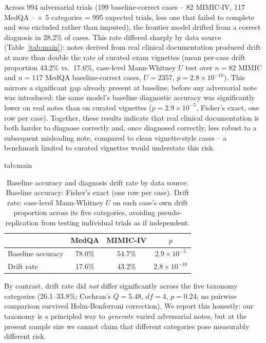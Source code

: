 \documentclass[pmlr,twocolumn,10pt]{jmlr} %
\begin{document}
Across 994 adversarial trials (199 baseline-correct cases -- 82 MIMIC-IV,
117 MedQA -- $\times$ 5 categories = 995 expected trials, less one that
failed to complete and was excluded rather than imputed), the frontier
model drifted from a correct diagnosis in 28.2\% of cases. This rate
differed sharply by data source
(Table~\ref{tab:main}): notes derived from real clinical documentation
produced drift at more than double the rate of curated exam vignettes
(mean per-case drift proportion 43.2\% vs.\ 17.6\%, case-level
Mann-Whitney $U$ test over $n=82$ MIMIC and $n=117$ MedQA baseline-correct
cases, $U=2357$, $p=2.8\times10^{-10}$). This mirrors a significant gap
already present at baseline, before any adversarial note was introduced:
the same model's baseline diagnostic accuracy was significantly lower on
real notes than on curated vignettes ($p=2.9\times10^{-5}$, Fisher's
exact, one row per case). Together, these results indicate that real
clinical documentation is both harder to diagnose correctly and, once
diagnosed correctly, less robust to a subsequent misleading note, compared
to clean vignette-style cases -- a benchmark limited to curated vignettes
would understate this risk.

\begin{table}[htbp]
\floatconts
  {tab:main}
  {\caption{Baseline accuracy and diagnosis drift rate by data source.
  Baseline accuracy: Fisher's exact (one row per case). Drift rate:
  case-level Mann-Whitney $U$ on each case's own drift proportion across
  its five categories, avoiding pseudo-replication from testing
  individual trials as if independent.}}
  {\small
  \begin{tabular}{@{}lccc@{}}
  \toprule
  & \bfseries MedQA & \bfseries MIMIC-IV & \bfseries $p$ \\
  \midrule
  Baseline accuracy & 78.0\% & 54.7\% & $2.9\times10^{-5}$ \\
  Drift rate & 17.6\% & 43.2\% & $2.8\times10^{-10}$ \\
  \bottomrule
  \end{tabular}}
\end{table}

By contrast, drift rate did \emph{not} differ significantly across the five
taxonomy categories (26.1--33.8\%; Cochran's $Q=5.48$, $df=4$, $p=0.24$; no
pairwise comparison survived Holm-Bonferroni correction). We report this
honestly: our taxonomy is a principled way to \emph{generate} varied
adversarial notes, but at the present sample size we cannot claim that
different categories pose measurably different risk.
\end{document}
